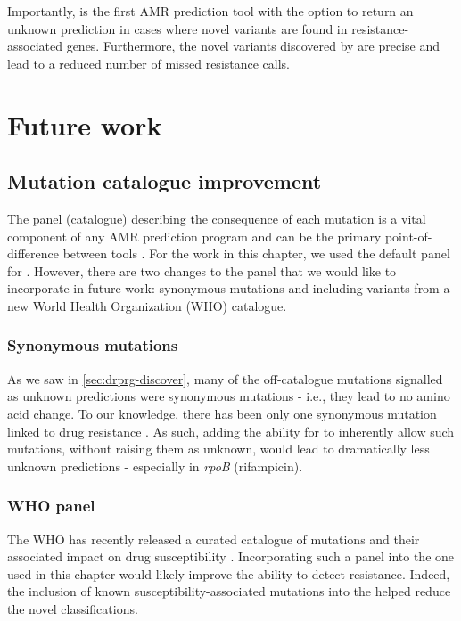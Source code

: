 Importantly, \drprg{} is the first \mtb{} AMR prediction tool with the option to return an unknown prediction in cases where novel variants are found in resistance-associated genes. Furthermore, the novel variants discovered by \drprg{} are precise and lead to a reduced number of missed resistance calls. 

\section{Future work}

\subsection{Mutation catalogue improvement}

The panel (catalogue) describing the consequence of each mutation is a vital component of any AMR prediction program and can be the primary point-of-difference between tools \cite{hunt2019}. For the work in this chapter, we used the default \mykrobe{} panel for \drprg{}. However, there are two changes to the \drprg{} panel that we would like to incorporate in future work: synonymous mutations and including variants from a new World Health Organization (WHO) catalogue.

\subsubsection{Synonymous mutations}

As we saw in \autoref{sec:drprg-discover}, many of the off-catalogue mutations signalled as unknown predictions were synonymous mutations - i.e., they lead to no amino acid change. To our knowledge, there has been only one synonymous mutation linked to \mtb{} drug resistance \cite{Ando2014}. As such, adding the ability for \drprg{} to inherently allow such mutations, without raising them as unknown, would lead to dramatically less unknown predictions - especially in \textit{rpoB} (rifampicin).

\subsubsection{WHO panel}

The WHO has recently released a curated catalogue of \mtb{} mutations and their associated impact on drug susceptibility \cite{whopanel2021}. Incorporating such a panel into the one used in this chapter would likely improve the ability to detect resistance. Indeed, the inclusion of known susceptibility-associated mutations into the \drprg{} helped reduce the novel classifications.

